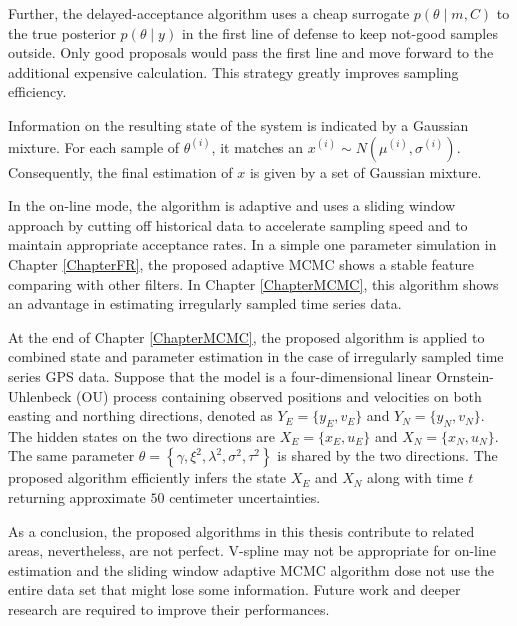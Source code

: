 Further, the delayed-acceptance algorithm uses a cheap surrogate $p(\theta\mid m, C)$ to the true posterior $p(\theta\mid y)$ in the first line of defense to keep not-good samples outside. Only good proposals would pass the first line and move forward to the additional expensive calculation. This strategy greatly improves sampling efficiency. 

Information on the resulting state of the system is indicated by a Gaussian mixture. For each sample of $\theta^{(i)}$, it matches an $x^{(i)} \sim N\left(\mu^{(i)},\sigma^{(i)}\right)$. Consequently, the final estimation of $x$ is given by a set of Gaussian mixture. 

In the on-line mode, the algorithm is adaptive and uses a sliding window approach by cutting off historical data to accelerate sampling speed and to maintain appropriate acceptance rates. In a simple one parameter simulation in Chapter \ref{ChapterFR}, the proposed adaptive MCMC shows a stable feature comparing with other filters. In Chapter \ref{ChapterMCMC}, this algorithm shows an advantage in estimating irregularly sampled time series data. 

At the end of Chapter \ref{ChapterMCMC}, the proposed algorithm is applied to combined state and parameter estimation in the case of irregularly sampled time series GPS data. Suppose that the model is a four-dimensional linear Ornstein-Uhlenbeck (OU) process containing observed positions and velocities on both easting and northing directions, denoted as $Y_E=\lbrace y_E,v_E\rbrace$ and $Y_N=\lbrace y_N,v_N\rbrace$. The hidden states on the two directions are $X_E=\lbrace x_E,u_E\rbrace$ and $X_N=\lbrace x_N,u_N\rbrace$. The same parameter $\theta=\left\lbrace\gamma,\xi^2,\lambda^2,\sigma^2,\tau^2\right\rbrace$ is shared by the two directions. The proposed algorithm efficiently infers the state $X_E$ and $X_N$ along with time $t$ returning approximate $50$ centimeter uncertainties. 

As a conclusion, the proposed algorithms in this thesis contribute to related areas, nevertheless, are not perfect. V-spline may not be appropriate for on-line estimation and the sliding window adaptive MCMC algorithm dose not use the entire data set that might lose some information. Future work and deeper research are required to improve their performances. 
